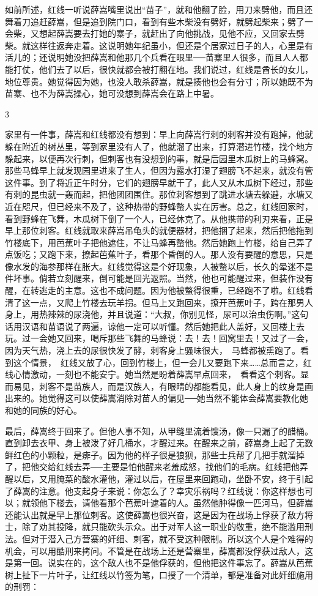 如前所述，红线一听说薛嵩嘴里说出“苗子”，就和他翻了脸，用刀来劈他，而且还舞着刀追赶薛嵩，但是追到院门口，看到有些木柴没有劈好，就劈起柴来；劈了一会柴，又想起薛嵩要去打她的寨子，就赶出了向他挑战，见他不应，又回家去劈柴。就这样往返奔走着。这说明她年纪虽小，但还是个居家过日子的人，心里是有活儿的；还说明她没把薛嵩和他那几个兵看在眼里──苗寨里人很多，而且人人都能打仗，他们去了以后，很快就都会被打翻在地。我们说过，红线是酋长的女儿，地位尊贵。她觉得因为她，也没人敢杀薛嵩，就是揍他也会有分寸；所以她既不为苗寨、也不为薛嵩操心，她可没想到薛嵩会在路上中暑。 

3 

家里有一件事，薛嵩和红线都没有想到：早上向薛嵩行刺的刺客并没有跑掉，他就躲在附近的树丛里，等到家里没有人了，他就溜了出来，打算潜进竹楼，找个地方躲起来，以便再次行刺，但刺客也有没想到的事，就是后园里木瓜树上的马蜂窝。那些马蜂早上就发现园里进来了生人，但因为露水打湿了翅膀飞不起来，就没有管这件事。到了将近正午时分，它们的翅膀早就干了，此人又从木瓜树下经过，那些有刺的昆虫就一轰而起，把他团团围住。那位刺客想到了跳进水塘去躲避，水塘又近在咫尺，但已经来不及了，这种热带的野蜂螫人实在厉害。总之，红线回家时，看到野蜂在飞舞，木瓜树下倒了一个人，已经休克了。从他携带的利刃来看，正是早上那位刺客。红线就取来薛嵩吊龟头的就便器材，把他捆了起来，然后把他拖到竹楼底下，用芭蕉叶子把他遮住，不让马蜂再螫他。然后她跑上竹楼，给自己弄了点饭吃；又跑下来，撩起芭蕉叶子，看那个昏倒的人。那人没有要醒的意思，只是像水发的海参那样在胀大。红线觉得这是个好现象，人被螫以后，长久的晕迷不是件坏事。倘若立刻醒来，倒可能是回光返照。当然，他也可能醒过来，但装作没有醒，在转逃走的主意。这也不成问题。因为他被螫得很重，已经跑不了啦。红线看清了这一点，又爬上竹楼去玩羊拐。但马上又跑回来，撩开芭蕉叶子，跨在那男人身上，用热辣辣的尿浇他，并且说道：“大叔，你别见怪，尿可以治虫伤啊。”这句话用汉语和苗语说了两遍，谅他一定可以听懂。然后她把此人盖好，又回楼上去玩。过一会她又回来，喝斥那些飞舞的马蜂说：去！去！回窝里去！又过了一会，因为天气热，浇上去的尿很快发了酵，刺客身上骚味很大，　马蜂都被熏跑了。看到这个情景，　红线又放了心，回到竹楼上，但一会儿又要跑下来……总而言之，红线心情激动，一刻也不能安宁。她当然是盼着薛嵩早点回来，　看看这个刺客。显而易见，刺客不是苗族人，而是汉族人，有眼睛的都能看见，此人身上的纹身是画出来的。她觉得这可以使薛嵩消除对苗人的偏见──她当然不能体会薛嵩要教化她和她的同族的好心。 

最后，薛嵩终于回来了。但他人事不知，从甲缝里流着馊汤，像一只漏了的醋桶。直到卸去衣甲、身上被泼了好几桶水，才醒过来。在醒来之前，薛嵩身上起了无数鲜红色的小颗粒，是痱子。因为他的样子很是狼狈，那些士兵帮了几把手就溜掉了，把他交给红线去弄──主要是怕他醒来老羞成怒，找他们的毛病。红线把他弄醒以后，又用腌菜的酸水灌他，灌过以后，在屋里来回跑动，坐卧不安，终于引起了薛嵩的注意。他支起身子来说：你怎么了？幸灾乐祸吗？红线说：你这样想也可以；就领他下楼去，请他看那个芭蕉叶遮着的人。虽然他肿得像一匹河马，但薛嵩还能认出就是早上那位刺客。这使薛嵩也很兴奋，这是因为在战场上俘获了敌方将士，除了劝其投降，就只能砍头示众。出于对军人这一职业的敬重，绝不能滥用刑法。但对于潜入己方营寨的奸细、刺客，就不受这种限制。所以这个人是个难得的机会，可以用酷刑来拷问。不管是在战场上还是营寨里，薛嵩都没俘获过敌人，这是第一回。说实在的，这个敌人也不是他俘获的，但他把这件事忘了。薛嵩从芭蕉树上扯下一片叶子，让红线以竹签为笔，口授了一个清单，都是准备对此奸细施用的刑罚： 

